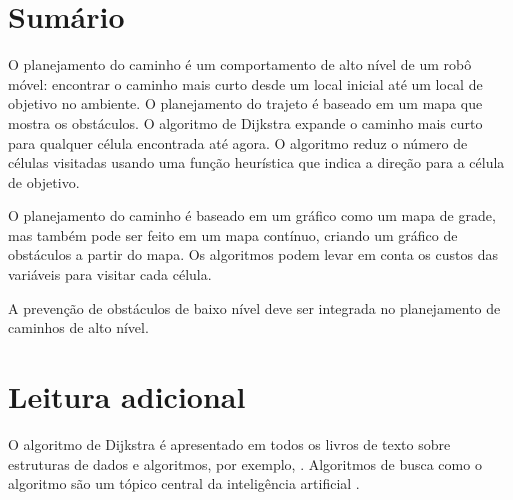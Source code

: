 \section{Sumário}

O planejamento do caminho é um comportamento de alto nível de um robô móvel: encontrar o caminho mais curto desde um local inicial até um local de objetivo no ambiente. O planejamento do trajeto é baseado em um mapa que mostra os obstáculos. O algoritmo de Dijkstra expande o caminho mais curto para qualquer célula encontrada até agora. O algoritmo \astar{} reduz o número de células visitadas usando uma função heurística que indica a direção para a célula de objetivo.

O planejamento do caminho é baseado em um gráfico como um mapa de grade, mas também pode ser feito em um mapa contínuo, criando um gráfico de obstáculos a partir do mapa. Os algoritmos podem levar em conta os custos das variáveis para visitar cada célula.

A prevenção de obstáculos de baixo nível deve ser integrada no planejamento de caminhos de alto nível.

\section{Leitura adicional}

O algoritmo de Dijkstra é apresentado em todos os livros de texto sobre estruturas de dados e algoritmos, por exemplo, \cite[Sect.~24.3]{crls3}. Algoritmos de busca como o algoritmo \astar{} são um tópico central da inteligência artificial \cite[Sect.~3.5]{ai}.
